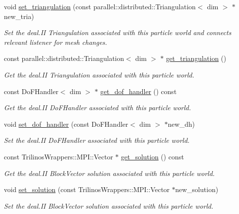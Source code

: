 \begin{DoxyCompactItemize}
void \hyperlink{classps__mmm_1_1_particle_1_1_world_acf86b29a2e09482e7c37420909f98fa2}{set\+\_\+triangulation} (const parallel\+::distributed\+::\+Triangulation$<$ dim $>$ $\ast$new\+\_\+tria)
\begin{DoxyCompactList}\small\item\em Set the deal.\+I\+I Triangulation associated with this particle world and connects relevant listener for mesh changes. \end{DoxyCompactList}\item 
const parallel\+::distributed\+::\+Triangulation$<$ dim $>$ $\ast$ \hyperlink{classps__mmm_1_1_particle_1_1_world_a3c4b7875ed3c1dbd3f81ab87a60e6e45}{get\+\_\+triangulation} ()
\begin{DoxyCompactList}\small\item\em Get the deal.\+I\+I Triangulation associated with this particle world. \end{DoxyCompactList}\item 
const Do\+F\+Handler$<$ dim $>$ $\ast$ \hyperlink{classps__mmm_1_1_particle_1_1_world_a2ebc92b736106d71fd09e02ac2369279}{get\+\_\+dof\+\_\+handler} () const 
\begin{DoxyCompactList}\small\item\em Get the deal.\+I\+I Do\+F\+Handler associated with this particle world. \end{DoxyCompactList}\item 
void \hyperlink{classps__mmm_1_1_particle_1_1_world_a118531edd5310425da8b7dc27b73425f}{set\+\_\+dof\+\_\+handler} (const Do\+F\+Handler$<$ dim $>$ $\ast$new\+\_\+dh)
\begin{DoxyCompactList}\small\item\em Set the deal.\+I\+I Do\+F\+Handler associated with this particle world. \end{DoxyCompactList}\item 
const Trilinos\+Wrappers\+::\+M\+P\+I\+::\+Vector $\ast$ \hyperlink{classps__mmm_1_1_particle_1_1_world_afe9e737c5bbbacdc4fcaf38944c16b5b}{get\+\_\+solution} () const 
\begin{DoxyCompactList}\small\item\em Get the deal.\+I\+I Block\+Vector solution associated with this particle world. \end{DoxyCompactList}\item 
void \hyperlink{classps__mmm_1_1_particle_1_1_world_ab71f6d70811eba002383d01ecc0db655}{set\+\_\+solution} (const Trilinos\+Wrappers\+::\+M\+P\+I\+::\+Vector $\ast$new\+\_\+solution)
\begin{DoxyCompactList}\small\item\em Set the deal.\+I\+I Block\+Vector solution associated with this particle world. \end{DoxyCompactList}\item 

\end{DoxyCompactItemize}
